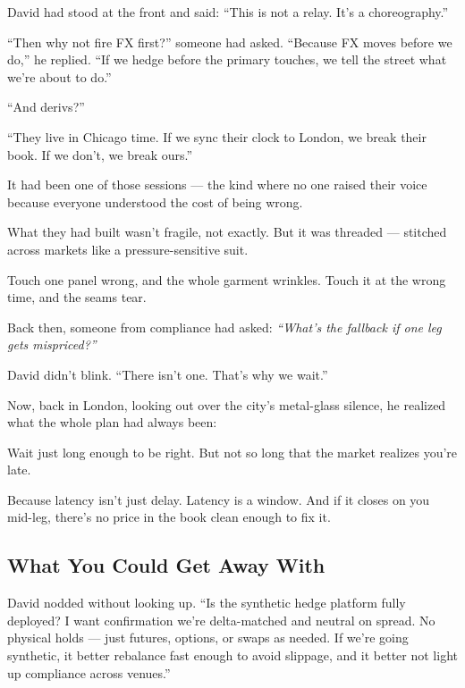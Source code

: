David had stood at the front and said:
“This is not a relay. It’s a choreography.”

“Then why not fire FX first?” someone had asked.
“Because FX moves before we do,” he replied. “If we hedge before the primary touches, we tell the 
street what we’re about to do.”

“And derivs?”

“They live in Chicago time. If we sync their clock to London, we break their book. If we don’t, 
we break ours.”

It had been one of those sessions — the kind where no one raised their voice because everyone 
understood the cost of being wrong.

What they had built wasn’t fragile, not exactly.
But it was threaded — stitched across markets like a pressure-sensitive suit.

Touch one panel wrong, and the whole garment wrinkles.
Touch it at the wrong time, and the seams tear.

Back then, someone from compliance had asked:
\textit{“What’s the fallback if one leg gets mispriced?”}

David didn’t blink.
“There isn’t one. That’s why we wait.”

Now, back in London, looking out over the city’s metal-glass silence,
he realized what the whole plan had always been:

Wait just long enough to be right.
But not so long that the market realizes you’re late.

Because latency isn’t just delay.
Latency is a window.
And if it closes on you mid-leg,
there’s no price in the book clean enough to fix it.





\subsection{What You Could Get Away With}


David nodded without looking up.
``Is the synthetic hedge platform fully deployed? I want confirmation we’re delta-matched and 
neutral on spread. No physical holds — just futures, options, or swaps as needed. If we’re going 
synthetic, it better rebalance fast enough to avoid slippage, and it better not light up 
compliance across venues.''

\medskip

